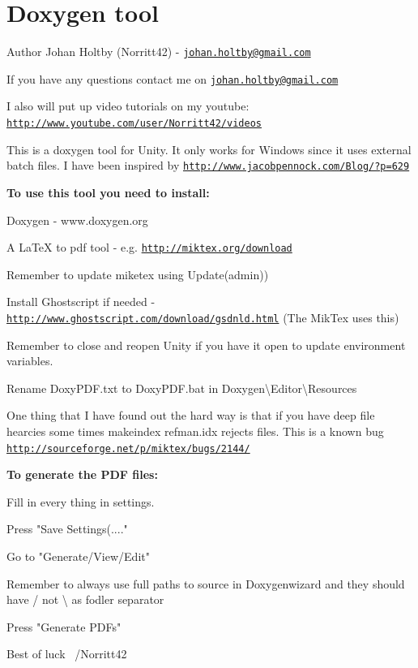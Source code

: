 \chapter{Doxygen tool }
\hypertarget{index}{}\label{index}
\begin{DoxyAuthor}{Author}
Johan Holtby (Norritt42) -\/ \href{mailto:johan.holtby@gmail.com}{\texttt{johan.\+holtby@gmail.\+com}}
\end{DoxyAuthor}
If you have any questions contact me on \href{mailto:johan.holtby@gmail.com}{\texttt{johan.\+holtby@gmail.\+com}}

I also will put up video tutorials on my youtube\+: \href{http://www.youtube.com/user/Norritt42/videos}{\texttt{http\+://www.\+youtube.\+com/user/\+Norritt42/videos}}

This is a doxygen tool for Unity. It only works for Windows since it uses external batch files. I have been inspired by \href{http://www.jacobpennock.com/Blog/?p=629}{\texttt{http\+://www.\+jacobpennock.\+com/\+Blog/?p=629}}

{\bfseries{To use this tool you need to install\+:}} 
\begin{DoxyEnumerate}
\item Doxygen -\/ www.\+doxygen.\+org 
\item A La\+TeX to pdf tool -\/ e.\+g. \href{http://miktex.org/download}{\texttt{http\+://miktex.\+org/download}}  
\item Remember to update miketex using Update(admin))  
\item Install Ghostscript if needed -\/ \href{http://www.ghostscript.com/download/gsdnld.html}{\texttt{http\+://www.\+ghostscript.\+com/download/gsdnld.\+html}} (The Mik\+Tex uses this) 
\item Remember to close and reopen Unity if you have it open to update environment variables. 
\item Rename Doxy\+PDF.\+txt to Doxy\+PDF.\+bat in Doxygen\textbackslash{}\+Editor\textbackslash{}\+Resources 
\end{DoxyEnumerate}

One thing that I have found out the hard way is that if you have deep file hearcies some times makeindex refman.\+idx rejects files. This is a known bug \href{http://sourceforge.net/p/miktex/bugs/2144/}{\texttt{http\+://sourceforge.\+net/p/miktex/bugs/2144/}}

{\bfseries{To generate the PDF files\+:}} 
\begin{DoxyEnumerate}
\item Fill in every thing in settings. 
\item Press "{}\+Save Settings(...."{} 
\item Go to "{}\+Generate/\+View/\+Edit"{} 
\item Remember to always use full paths to source in Doxygenwizard and they should have / not \textbackslash{} as fodler separator 
\item Press "{}\+Generate PDFs"{} 
\end{DoxyEnumerate}

Best of luck~\newline
/\+Norritt42 
